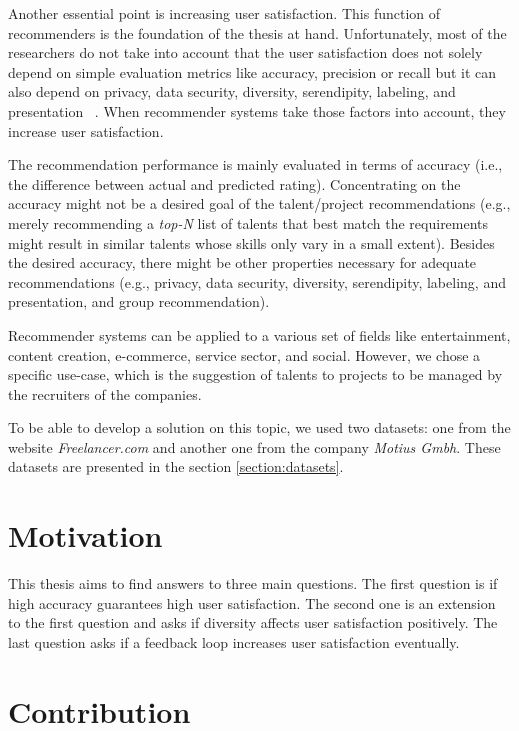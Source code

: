 Another essential point is increasing user satisfaction. This function of recommenders is the foundation of the thesis at hand. Unfortunately, most of the researchers do not take into account that the user satisfaction does not solely depend on simple evaluation metrics like accuracy, precision or recall but it can also depend on privacy, data security, diversity, serendipity, labeling, and presentation ~\parencite{Beel2016}. When recommender systems take those factors into account, they increase user satisfaction.


The recommendation performance is mainly evaluated in terms of accuracy (i.e., the difference between actual and predicted rating). Concentrating on the accuracy might not be a desired goal of the talent/project recommendations (e.g., merely recommending a \textit{top-N} list of talents that best match the requirements might result in similar talents whose skills only vary in a small extent). Besides the desired accuracy, there might be other properties necessary for adequate recommendations (e.g., privacy, data security, diversity, serendipity, labeling, and presentation, and group recommendation).


Recommender systems can be applied to a various set of fields like entertainment, content creation, e-commerce, service sector, and social. However, we chose a specific use-case, which is the suggestion of talents to projects to be managed by the recruiters of the companies.


To be able to develop a solution on this topic, we used two datasets: one from the website \textit{Freelancer.com} and another one from the company \textit{Motius Gmbh}. These datasets are presented in the section \ref{section:datasets}.


\section{Motivation}\label{section:motivation}

This thesis aims to find answers to three main questions. The first question is if high accuracy guarantees high user satisfaction. The second one is an extension to the first question and asks if diversity affects user satisfaction positively. The last question asks if a feedback loop increases user satisfaction eventually.


\section{Contribution}

